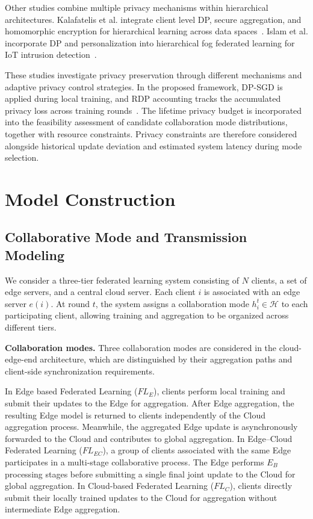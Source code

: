\documentclass[5p,times]{elsarticle}
\theoremstyle{plain}
\theoremstyle{definition}
\theoremstyle{remark}
\begin{document}
	Other studies combine multiple privacy mechanisms
	within hierarchical architectures.
	Kalafatelis et al. integrate client level DP,
	secure aggregation, and homomorphic encryption
	for hierarchical learning across data
	spaces~\cite{PPHFL}.
	Islam et al. incorporate DP and personalization
	into hierarchical fog federated learning
	for IoT intrusion detection~\cite{islam2025pphffl}.
	
	These studies investigate privacy preservation
	through different mechanisms and adaptive
	privacy control strategies.
	In the proposed framework, DP-SGD is applied
	during local training, and RDP accounting
	tracks the accumulated privacy loss across
	training rounds~\cite{abadi2016deep,mironov2017renyi}.
	The lifetime privacy budget is incorporated
	into the feasibility assessment of candidate
	collaboration mode distributions, together
	with resource constraints.
	Privacy constraints are therefore considered
	alongside historical update deviation and
	estimated system latency during mode selection.
	\section{Model Construction}
	\label{sec:model}
	\subsection{Collaborative Mode and Transmission Modeling}
	\label{sec:link_model}
	We consider a three-tier federated learning system
	consisting of \(N\) clients, a set of edge servers,
	and a central cloud server. Each client \(i\) is
	associated with an edge server \(e(i)\). At round
	\(t\), the system assigns a collaboration mode
	\(h_i^t\in\mathcal H\) to each participating client,
	allowing training and aggregation to be organized
	across different tiers.
	
	\textbf{Collaboration modes.}
	Three collaboration modes are considered in the 
	cloud-edge-end architecture, which are distinguished 
	by their aggregation paths and client-side synchronization 
	requirements.
	
	In Edge based Federated Learning ($FL_E$),
	clients perform local training and submit
	their updates to the Edge for aggregation.
	After Edge aggregation, the resulting Edge
	model is returned to clients independently
	of the Cloud aggregation process. Meanwhile,
	the aggregated Edge update is asynchronously
	forwarded to the Cloud and contributes to
	global aggregation. In 
	Edge--Cloud Federated Learning ($FL_{EC}$), a group of 
	clients associated with the same Edge participates in a 
	multi-stage collaborative process. The Edge performs $E_B$ 
	processing stages before submitting a single final joint 
	update to the Cloud for global aggregation. In Cloud-based 
	Federated Learning ($FL_C$), clients directly submit their 
	locally trained updates to the Cloud for aggregation without 
	intermediate Edge aggregation.
	
\end{document}
